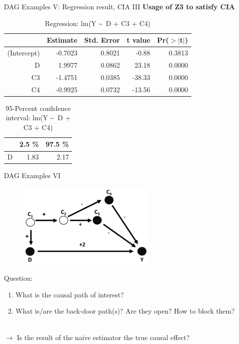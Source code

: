 \documentclass{beamer}\usepackage[]{graphicx}\usepackage[]{color}
\begin{document}
\begin{frame}[fragile]{DAG Examples V: Regression result, CIA III}
\textbf{Usage of Z3 to satisfy CIA}
\begin{table}[ht]
\centering
\begingroup\small
\begin{tabular}{rrrrr}
  \hline
 & Estimate & Std. Error & t value & Pr($>$$|$t$|$) \\ 
  \hline
(Intercept) & -0.7023 & 0.8021 & -0.88 & 0.3813 \\ 
  D & 1.9977 & 0.0862 & 23.18 & 0.0000 \\ 
  C3 & -1.4751 & 0.0385 & -38.33 & 0.0000 \\ 
  C4 & -0.9925 & 0.0732 & -13.56 & 0.0000 \\ 
   \hline
\end{tabular}
\endgroup
\caption{Regression: lm(Y \textasciitilde ~D + C3 + C4)} 
\end{table}
\begin{table}[ht]
\centering
\begingroup\small
\begin{tabular}{rrr}
  \hline
 & 2.5 \% & 97.5 \% \\ 
  \hline
D & 1.83 & 2.17 \\ 
   \hline
\end{tabular}
\endgroup
\caption{95-Percent confidence interval: lm(Y \textasciitilde ~D + C3 + C4)} 
\end{table}

\end{frame}




\begin{frame}{DAG Examples VI}
\\[1em]
\begin{figure}
\centering
\includegraphics[width=0.6\textwidth]{Graphics/6.TwoBack-doorpaths-Covered(missings).png}
\end{figure}
Question:
\begin{enumerate}
\item What is the causal path of interest?
\item What is/are the back-door path(s)? Are they open? How to block them?
\end{enumerate}
\\[1em]
$\rightarrow$ Is the result of the naive estimator the true causal effect?
\end{frame}
\end{document}
